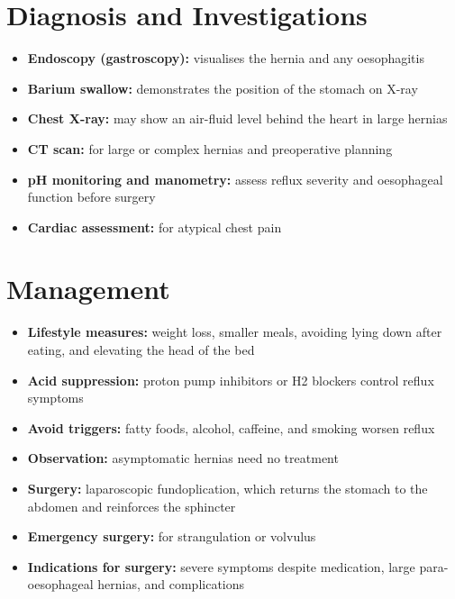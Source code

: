 \section*{Diagnosis and Investigations}
\begin{itemize}
    \item \textbf{Endoscopy (gastroscopy):} visualises the hernia and any oesophagitis
    \item \textbf{Barium swallow:} demonstrates the position of the stomach on X-ray
    \item \textbf{Chest X-ray:} may show an air-fluid level behind the heart in large hernias
    \item \textbf{CT scan:} for large or complex hernias and preoperative planning
    \item \textbf{pH monitoring and manometry:} assess reflux severity and oesophageal function before surgery
    \item \textbf{Cardiac assessment:} for atypical chest pain
\end{itemize}

\section*{Management}
\begin{itemize}
    \item \textbf{Lifestyle measures:} weight loss, smaller meals, avoiding lying down after eating, and elevating the head of the bed
    \item \textbf{Acid suppression:} proton pump inhibitors or H2 blockers control reflux symptoms
    \item \textbf{Avoid triggers:} fatty foods, alcohol, caffeine, and smoking worsen reflux
    \item \textbf{Observation:} asymptomatic hernias need no treatment
    \item \textbf{Surgery:} laparoscopic fundoplication, which returns the stomach to the abdomen and reinforces the sphincter
    \item \textbf{Emergency surgery:} for strangulation or volvulus
    \item \textbf{Indications for surgery:} severe symptoms despite medication, large para-oesophageal hernias, and complications
\end{itemize}


